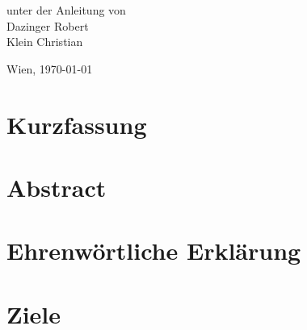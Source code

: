 \documentclass[
    headings=optiontotocandhead,%
    twoside,
    numbers=noenddot,%
    toc=flat, %
    12pt, %
    titlepage, %
    parskip=full, %
    listof=totoc, %
    listof=flat, %
    numbers=noenddot, %
    bibliography=totoc, %
    a4paper,DIV=14,
    BCOR=15mm,
]{scrbook}
\begin{document}
\begin{titlepage}
\begin{center}
\par\end{center}{\large \par}

\begin{center}
\vspace{20mm}
 \normalsize unter der Anleitung von\\
 \vspace{0.5cm}
 Dazinger Robert\\
Klein Christian
\par\end{center}

\begin{center}
\vspace{5mm}
Wien, \today
\par\end{center}

\end{titlepage}%
\chapter*{Kurzfassung}


\chapter*{Abstract}


\chapter*{Ehrenwörtliche Erklärung}


\cleardoublepage{}
\tableofcontents{}
\cleardoublepage{}
\listoftables
{}
\cleardoublepage{}
\listoffigures


\cleardoublepage{}
\mainmatter

\chapter{Ziele}
\renewcommand{\kapitelautor}{Autor: Rafael Doja}

\end{document}
